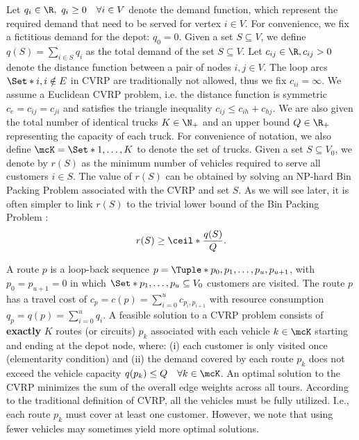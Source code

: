 Let $q_{i} \in \R,\ q_{i} \ge 0 \quad \forall i \in V$ denote the demand function,
which represent the required demand that need to be served for vertex $i \in V$.
For convenience, we fix a fictitious demand for the depot: $q_0 = 0$.
Given a set $S \subseteq V$, we define $q(S) = \sum_{i \in S} q_i$ as the total demand of the set $S \subseteq V$.
Let $c_{ij} \in \R, c_{ij} > 0$ denote the distance function between a pair of nodes  $i, j \in V$.
The loop arcs $\Set*{i, i} \notin E$ in CVRP are traditionally not allowed, thus we fix $c_{ii} = \infty$.
We assume a Euclidean CVRP problem, i.e. the distance function is symmetric $c_e = c_{ij} = c_{ji}$
and satisfies the triangle inequality $c_{ij} \le c_{ih} + c_{hj}$.
We are also given the total number of identical trucks $K \in \N_+$
and an upper bound $Q \in \R_+$ representing the capacity of each truck.
For convenience of notation, we also define $\mcK = \Set*{1, \dots, K}$ to denote the set of trucks.
Given a set $S \subseteq V_0$,
we denote by $r(S)$ as the minimum number of vehicles required to serve all customers $i \in S$.
The value of $r(S)$ can be obtained by solving an NP-hard Bin Packing Problem associated with the CVRP and set $S$.
As we will see later,
it is often simpler to link $r(S)$ to the trivial lower bound of the Bin Packing Problem \parencite{martello1990, martello1990knapsack}:
\begin{equation}
	r(S) \ge \ceil*{\frac{q(S)}{Q}}.
\end{equation}

A route $p$ is a loop-back sequence $p = \Tuple*{p_0, p_1, \dots, p_u, p_{u + 1}}$,
with $p_0 = p_{u + 1} = 0$
in which $\Set*{p_1, \dots, p_u} \subseteq V_0$ customers are visited.
The route $p$ has a travel cost of $c_p = c(p) = \sum_{i=0}^{u} c_{p_i,p_{i+1}}$
with resource consumption $q_p = q(p) = \sum_{i=0}^{u} q_{i}$.
A feasible solution to a CVRP problem consists of \textbf{exactly} $K$ routes (or circuits) $p_k$
associated with each vehicle $k \in \mcK$ starting and ending at the depot node,
where:
(i) each customer is only visited once (elementarity condition)
and (ii) the demand covered by each route $p_k$ does not exceed the vehicle capacity $q(p_k) \le Q \quad \forall k \in \mcK$.
An optimal solution to the CVRP minimizes the sum of the overall edge weights across all tours.
According to the traditional definition of CVRP, all the vehicles must be fully utilized.
I.e., each route $p_k$ must cover at least one customer.
However, we note that using fewer vehicles may sometimes yield more optimal solutions.

